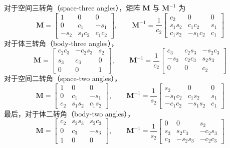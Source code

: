 对于空间三转角（space-three angles），矩阵 $\bm{M}$ 与 $\bm{M}^{-1}$ 为
\begin{equation}
    \bm{M} = \begin{bmatrix}
        1 & 0 & 0\\
        0 & c_1 & -s_1\\
        -s_2 & s_1c_2 & c_1c_2
    \end{bmatrix},\qquad
    \bm{M}^{-1} = \frac{1}{c_2}\begin{bmatrix}
        c_2 & 0 & 0\\
        s_1s_2 & c_1c_2 & s_1\\
        c_1s_2 & -s_1c_2 & c_1
    \end{bmatrix}
    \label{eq:方向角角速度:空间三转角}
\end{equation}
对于体三转角（body-three angles），
\begin{equation}
    \bm{M} = \begin{bmatrix}
        c_2c_3 & -c_2s_3 & s_2\\
        s_3 & c_3 & 0\\
        0 & 0 & 1
    \end{bmatrix},\qquad
    \bm{M}^{-1} = \frac{1}{c_2}\begin{bmatrix}
        c_3 & c_2s_3 & -s_2c_3\\
        -s_3 & c_2c_3 & s_2s_3\\
        0 & 0 & c_2
    \end{bmatrix}
    \label{eq:方向角角速度:体三转角}
\end{equation}
对于空间二转角（space-two angles），
\begin{equation}
    \bm{M} = \begin{bmatrix}
        1 & 0 & 0\\
        0 & c_1 & -s_1\\
        c_2 & s_1s_2 & c_1s_2
    \end{bmatrix},\qquad
    \bm{M}^{-1} = \frac{1}{s_2}\begin{bmatrix}
        s_2 & 0 & 0\\
        -s_1c_2 & c_1s_2 & s_1\\
        -c_1c_2 & -s_1s_2 & c_1
    \end{bmatrix}
    \label{eq:方向角角速度:空间二转角}
\end{equation}
最后，对于体二转角（body-two angles），
\begin{equation}
    \bm{M} = \begin{bmatrix}
        c_2 & s_2s_3 & s_2c_3\\
        0 & c_3 & -s_3\\
        1 & 0 & 0
    \end{bmatrix},\qquad
    \bm{M}^{-1} = \frac{1}{s_2}\begin{bmatrix}
        0 & 0 & s_2\\
        s_3 & s_2c_3 & -c_2s_3\\
        c_3 & -s_2s_3 & -c_2c_3
    \end{bmatrix}
    \label{eq:方向角角速度:体二转角}
\end{equation}
